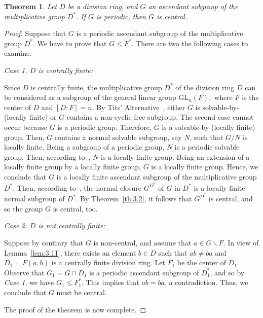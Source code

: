 \documentclass{amsart}
\newtheorem{theorem}{Theorem}[section]
\theoremstyle{definition}
\begin{document}
\begin{theorem}\label{th:4.1} Let $D$ be a division ring, and  $G$ an ascendant subgroup of the multiplicative group $D^*$. If $G$ is periodic, then $G$ is central.
\end{theorem} 
\begin{proof}
	Suppose that $G$ is a periodic ascendant subgroup of the multiplicative group $D^*$. We have to prove that $G\le F^*$. There are two the following cases to examine.
	
	\medskip 
	
	\textit{Case 1. $D$ is centrally finite:}
	
	\medskip
	Since $D$ is centrally finite, the multiplicative group $D^*$ of the division ring $D$ can be considered as a subgroup of the general linear group $\mathrm{GL}_n(F),$ where $F$ is the center of $D$ and $[D:F]=n.$ By Tits' Alternative~\cite{Pa_Tits_1972}, either $G$ is solvable-by-(locally finite) or $G$ contains a non-cyclic free subgroup. The second case cannot occur because $G$ is a periodic group. Therefore, $G$ is a solvable-by-(locally finite) group. Then, $G$ contains a normal solvable subgroup, say $N$, such that $G/N$ is locally finite. Being a subgroup of a periodic group, $N$ is a periodic solvable group. Then, according to~\cite[1.3.5]{Bo_Lennox_2004}, $N$ is a locally finite group. Being an extension of a locally finite group by a locally finite group, $G$ is a locally finite group. Hence, we conclude that $G$ is a locally finite ascendant subgroup of the multiplicative group $D^*.$ Then, according to~\cite[Proposition 1.2.15]{Bo_Dixon_2017}, the normal closure $G^{D^*}$ of $G$ in $D^*$ is a locally finite normal subgroup of $D^*.$ By Theorem~\ref{th:3.2}, it follows that $G^{D^*}$ is central, and so the group $G$ is central, too.
	
	\medskip
	
	\textit{Case 2. $D$ is not centrally finite:}
	
	\medskip
	
	Suppose by contrary that $G$ is non-central, and assume that $a\in G\backslash F$. In view of Lemma~\ref{lem:3.11}, there exists an element $b\in D$ such that $ab\ne ba$ and $D_1=F(a,b)$ is a centrally finite division ring. Let $F_1$ be the center of $D_1$. Observe that $G_1=G\cap D_1$ is a periodic ascendant subgroup of $D_1^*$, and so by \textit{Case 1}, we have $G_1\le F_1^*$. This implies that $ab=ba$, a contradiction. Thus, we conclude that $G$ must be central.
	
	The proof of the theorem is now complete. 
\end{proof} 
\end{document}
